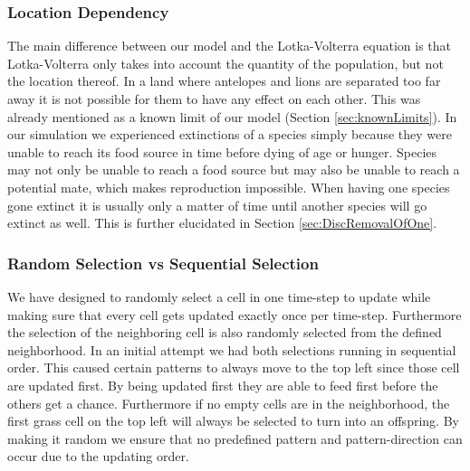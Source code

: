 \documentclass[11pt]{article}
\begin{document}
\subsubsection{Location Dependency}
\label{sec:DiscLocationDep}
The main difference between our model and the Lotka-Volterra equation is that Lotka-Volterra only takes into account the quantity of the population, but not the location thereof. In a land where antelopes and lions are separated too far away it is not possible for them to have any effect on each other. This was already mentioned as a known limit of our model (Section \ref{sec:knownLimits}). In our simulation we experienced extinctions of a species simply because they were unable to reach its food source in time before dying of age or hunger. Species may not only be unable to reach a food source but may also be unable to reach a potential mate, which makes reproduction impossible. When having one species gone extinct it is usually only a matter of time until another species will go extinct as well. This is further elucidated in Section \ref{sec:DiscRemovalOfOne}.

\subsubsection{Random Selection vs Sequential Selection}
We have designed to randomly select a cell in one time-step to update while making sure that every cell gets updated exactly once per time-step. Furthermore the selection of the neighboring cell is also randomly selected from the defined neighborhood. In an initial attempt we had both selections running in sequential order. This caused certain patterns to always move to the top left since those cell are updated first. By being updated first they are able to feed first before the others get a chance. Furthermore if no empty cells are in the neighborhood, the first grass cell on the top left will always be selected to turn into an offspring. By making it random we ensure that no predefined pattern and pattern-direction can occur due to the updating order.
\end{document}
